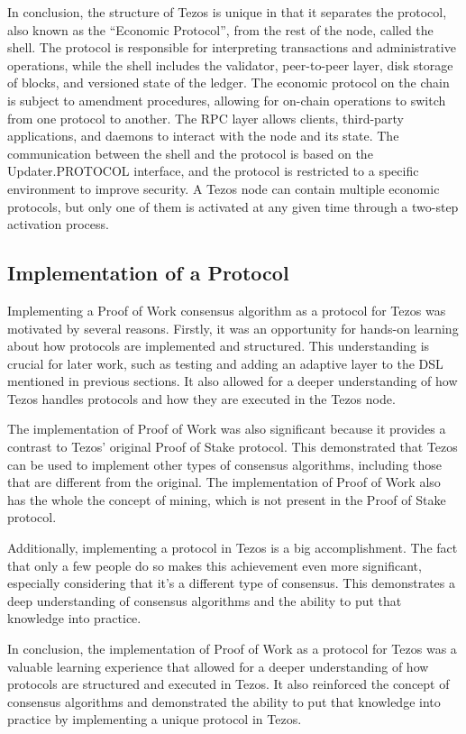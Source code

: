 In conclusion, the structure of Tezos is unique in that it separates the protocol, also known as the ``Economic Protocol'', from the rest of the node, called the shell. The protocol is responsible for interpreting transactions and administrative operations, while the shell includes the validator, peer-to-peer layer, disk storage of blocks, and versioned state of the ledger. The economic protocol on the chain is subject to amendment procedures, allowing for on-chain operations to switch from one protocol to another. The RPC layer allows clients, third-party applications, and daemons to interact with the node and its state. The communication between the shell and the protocol is based on the Updater.PROTOCOL interface, and the protocol is restricted to a specific environment to improve security. A Tezos node can contain multiple economic protocols, but only one of them is activated at any given time through a two-step activation process.


\subsection*{\textbf{Implementation of a Protocol}}

Implementing a Proof of Work consensus algorithm as a protocol for Tezos was motivated by several reasons. Firstly, it was an opportunity for hands-on learning about how protocols are implemented and structured. This understanding is crucial for later work, such as testing and adding an adaptive layer to the DSL mentioned in previous sections. It also allowed for a deeper understanding of how Tezos handles protocols and how they are executed in the Tezos node.

The implementation of Proof of Work was also significant because it provides a contrast to Tezos' original Proof of Stake protocol. This demonstrated that Tezos can be used to implement other types of consensus algorithms, including those that are different from the original. The implementation of Proof of Work also has the whole the concept of mining, which is not present in the Proof of Stake protocol.

Additionally, implementing a protocol in Tezos is a big accomplishment. The fact that only a few people do so makes this achievement even more significant, especially considering that it's a different type of consensus. This demonstrates a deep understanding of consensus algorithms and the ability to put that knowledge into practice.

In conclusion, the implementation of Proof of Work as a protocol for Tezos was a valuable learning experience that allowed for a deeper understanding of how protocols are structured and executed in Tezos. It also reinforced the concept of consensus algorithms and demonstrated the ability to put that knowledge into practice by implementing a unique protocol in Tezos.


